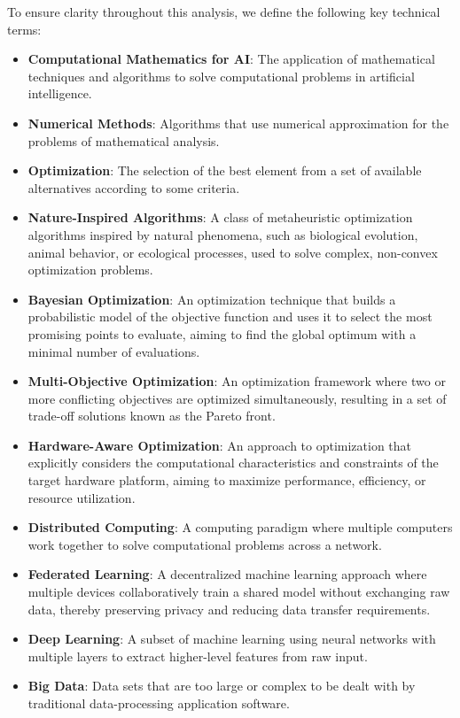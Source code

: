 \documentclass[acmsmall]{acmart}
\begin{document}
To ensure clarity throughout this analysis, we define the following key technical terms:
\begin{itemize}
    \item \textbf{Computational Mathematics for AI}: The application of mathematical techniques and algorithms to solve computational problems in artificial intelligence.
    \item \textbf{Numerical Methods}: Algorithms that use numerical approximation for the problems of mathematical analysis.
    \item \textbf{Optimization}: The selection of the best element from a set of available alternatives according to some criteria.
    \item \textbf{Nature-Inspired Algorithms}: A class of metaheuristic optimization algorithms inspired by natural phenomena, such as biological evolution, animal behavior, or ecological processes, used to solve complex, non-convex optimization problems.
    \item \textbf{Bayesian Optimization}: An optimization technique that builds a probabilistic model of the objective function and uses it to select the most promising points to evaluate, aiming to find the global optimum with a minimal number of evaluations.
    \item \textbf{Multi-Objective Optimization}: An optimization framework where two or more conflicting objectives are optimized simultaneously, resulting in a set of trade-off solutions known as the Pareto front.
    \item \textbf{Hardware-Aware Optimization}: An approach to optimization that explicitly considers the computational characteristics and constraints of the target hardware platform, aiming to maximize performance, efficiency, or resource utilization.
    \item \textbf{Distributed Computing}: A computing paradigm where multiple computers work together to solve computational problems across a network.
    \item \textbf{Federated Learning}: A decentralized machine learning approach where multiple devices collaboratively train a shared model without exchanging raw data, thereby preserving privacy and reducing data transfer requirements.
    \item \textbf{Deep Learning}: A subset of machine learning using neural networks with multiple layers to extract higher-level features from raw input.
    \item \textbf{Big Data}: Data sets that are too large or complex to be dealt with by traditional data-processing application software.

\end{itemize}
\end{document}
